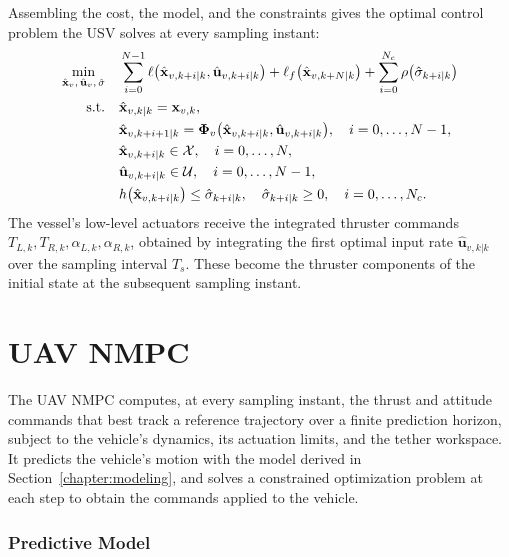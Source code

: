 Assembling the cost, the model, and the constraints gives the optimal control problem the USV solves at every sampling instant:
\begin{align}
    \min_{\hat{\mathbf{x}}_v,\, \hat{\mathbf{u}}_v,\, \hat{\sigma}} \quad & \sum_{i=0}^{N-1} \ell\big(\hat{\mathbf{x}}_{v,k+i|k}, \hat{\mathbf{u}}_{v,k+i|k}\big) + \ell_f\big(\hat{\mathbf{x}}_{v,k+N|k}\big) + \sum_{i=0}^{N_c} \rho\big(\hat\sigma_{k+i|k}\big) \notag \\
    \text{s.t.} \quad & \hat{\mathbf{x}}_{v,k|k} = \mathbf{x}_{v,k}, \notag \\
    & \hat{\mathbf{x}}_{v,k+i+1|k} = \boldsymbol\Phi_v\big(\hat{\mathbf{x}}_{v,k+i|k}, \hat{\mathbf{u}}_{v,k+i|k}\big), \quad i = 0, \dots, N-1, \notag \\
    & \hat{\mathbf{x}}_{v,k+i|k} \in \mathcal{X}, \quad i = 0, \dots, N, \notag \\
    & \hat{\mathbf{u}}_{v,k+i|k} \in \mathcal{U}, \quad i = 0, \dots, N-1, \notag \\
    & h\big(\hat{\mathbf{x}}_{v,k+i|k}\big) \le \hat\sigma_{k+i|k}, \quad \hat\sigma_{k+i|k} \ge 0, \quad i = 0, \dots, N_c. \label{eq:usv_mpc_ocp}
\end{align}
The vessel's low-level actuators receive the integrated thruster commands $T_{L,k}, T_{R,k}, \alpha_{L,k}, \alpha_{R,k}$, obtained by integrating the first optimal input rate $\hat{\mathbf{u}}_{v,k|k}$ over the sampling interval $T_s$. These become the thruster components of the initial state at the subsequent sampling instant.
 
\section{UAV NMPC}
\label{sec:ctrl_uav_mpc}

The UAV NMPC computes, at every sampling instant, the thrust and attitude commands that best track a reference trajectory over a finite prediction horizon, subject to the vehicle's dynamics, its actuation limits, and the tether workspace. It predicts the vehicle's motion with the model derived in Section~\ref{chapter:modeling}, and solves a constrained optimization problem at each step to obtain the commands applied to the vehicle.

\subsubsection*{Predictive Model}

